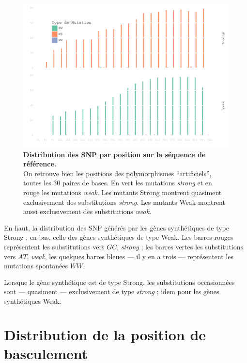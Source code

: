 \documentclass[a4paper]{tufte-handout}
\begin{document}
\begin{figure}[h]
  \centering
  \includegraphics[width=\linewidth]{../mutant_snp_distribution.pdf}
  \caption{\textbf{Distribution des SNP par position sur la séquence de référence.} \\
    On retrouve bien les positions des polymorphismes ``artificiels'', toutes
    les $30$ paires de bases. En vert les mutations \emph{strong} et en rouge
    les mutations \emph{weak}. Les mutants Strong montrent quasiment
    exclusivement des substitutions \emph{strong}. Les mutants Weak montrent
    aussi exclusivement des substitutions \emph{weak}. }
  \label{fig:mutsnpdistrib}
\end{figure}

En haut, la distribution des SNP générés par les gènes synthétiques de type
Strong ; en bas, celle des gènes synthétiques de type Weak. Les barres rouges 
représentent les substitutions vers \(GC\), \emph{strong} ; les barres vertes les
substitutions vers \(AT\), \emph{weak}, les quelques barres bleues --- il y en a trois
--- représentent les mutations spontanées \(WW\). 

Lorsque le gène synthétique est de type Strong, les substitutions occasionnées
sont --- quasiment --- exclusivement de type \emph{strong} ; idem pour les gènes
synthétiques Weak. 

\clearpage
\section{Distribution de la position de basculement}
\label{sec:orgheadline9}
\end{document}
